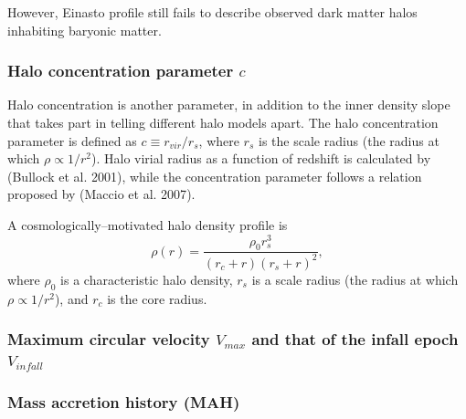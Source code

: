 \documentclass[paper=a4, fontsize=11pt]{scrartcl} %
\numberwithin{equation}{section} %
\numberwithin{figure}{section} %
\numberwithin{table}{section} %
\begin{document}
However, Einasto profile still fails to describe observed dark matter halos inhabiting baryonic matter.   

\subsubsection*{Halo concentration parameter $c$}
Halo concentration is another parameter, in addition to the inner density slope that takes part in telling different halo models apart. The halo concentration parameter is defined as $c \equiv r_{vir}/r_s$, where $r_s$ is the scale radius (the radius at which $\rho \propto 1/r^2$). Halo virial radius as a function of redshift is calculated by ({Bullock et al. 2001}), while the concentration parameter follows a relation proposed by ({Maccio et al. 2007}).

A cosmologically--motivated halo density profile is
\begin{equation}
\rho(r) = \frac{\rho_0 r_s^3}{(r_c + r)(r_s + r)^2},
\end{equation}
where $\rho_0$ is a characteristic halo density, $r_s$ is a scale radius (the radius at which $\rho \propto 1/r^2$), and $r_c$ is the core radius. 

\subsubsection*{Maximum circular velocity $V_{max}$ and that of the infall epoch $V_{infall}$}
\subsubsection*{Mass accretion history (MAH)}
\end{document}
